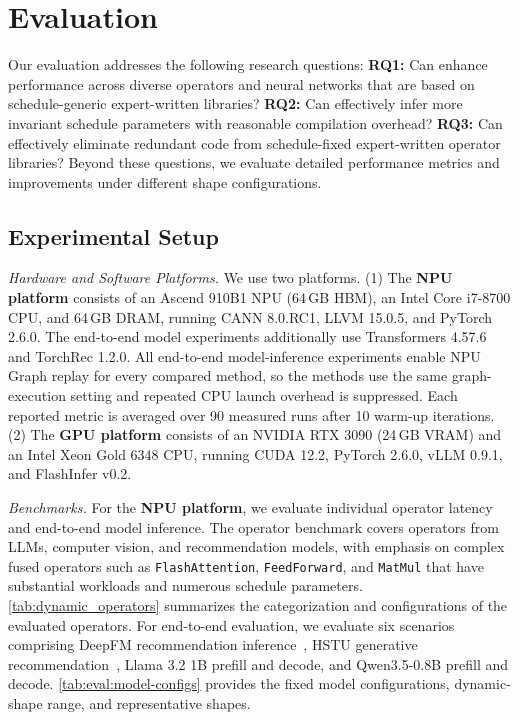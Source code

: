 \section{Evaluation}
\label{sec:eval}

Our evaluation addresses the following research questions: 
\textbf{RQ1:} Can \mysys enhance performance across diverse operators and neural networks that are based on schedule-generic expert-written libraries?
\textbf{RQ2:} Can \mysys effectively infer more invariant schedule parameters with reasonable compilation overhead?
\textbf{RQ3:} Can \mysys effectively eliminate redundant code from schedule-fixed expert-written operator libraries?
Beyond these questions, we evaluate detailed performance metrics and improvements under different shape configurations.

\subsection{Experimental Setup}
\label{sec:eval:setup}

\textit{Hardware and Software Platforms.}
We use two platforms. (1) The \textbf{NPU platform} consists of an Ascend 910B1 NPU (64\,GB HBM), an Intel Core i7-8700 CPU, and 64\,GB DRAM, running CANN 8.0.RC1, LLVM 15.0.5, and PyTorch 2.6.0. The end-to-end model experiments additionally use Transformers 4.57.6 and TorchRec 1.2.0. All end-to-end model-inference experiments enable NPU Graph replay for every compared method, so the methods use the same graph-execution setting and repeated CPU launch overhead is suppressed. Each reported metric is averaged over 90 measured runs after 10 warm-up iterations. (2) The \textbf{GPU platform} consists of an NVIDIA RTX 3090 (24\,GB VRAM) and an Intel Xeon Gold 6348 CPU, running CUDA 12.2, PyTorch 2.6.0, vLLM 0.9.1, and FlashInfer v0.2.





\textit{Benchmarks.}
\label{sec:eval:bench}
For the \textbf{NPU platform}, we evaluate individual operator latency and end-to-end model inference.
The operator benchmark covers operators from LLMs, computer vision, and recommendation models, with emphasis on complex fused operators such as \texttt{FlashAttention}, \texttt{FeedForward}, and \texttt{MatMul} that have substantial workloads and numerous schedule parameters.
\autoref{tab:dynamic_operators} summarizes the categorization and configurations of the evaluated operators.
For end-to-end evaluation, we evaluate six scenarios comprising DeepFM recommendation inference~\cite{ijcai2017p239}, HSTU generative recommendation~\cite{pmlr-v235-zhai24a}, Llama 3.2 1B prefill and decode, and Qwen3.5-0.8B prefill and decode.
\autoref{tab:eval:model-configs} provides the fixed model configurations, dynamic-shape range, and representative shapes.

